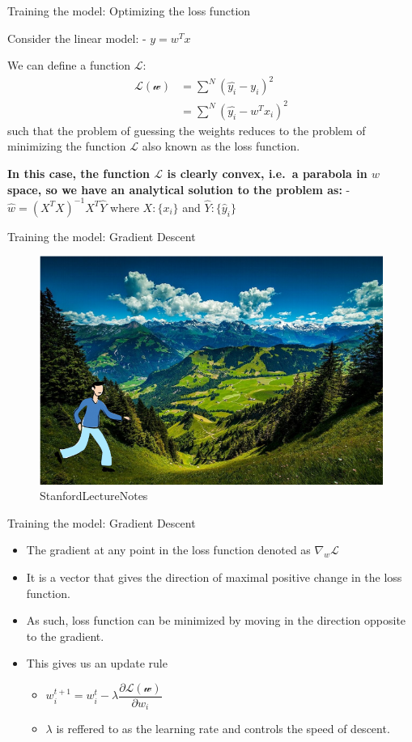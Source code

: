 \documentclass[11pt]{article}
\makeatletter
\def\maxwidth{\ifdim\Gin@nat@width>\linewidth\linewidth
    \else\Gin@nat@width\fi}
\let\Oldincludegraphics\includegraphics
\renewcommand{\includegraphics}[1]{\Oldincludegraphics[width=.8\maxwidth]{#1}}
\providecommand{\tightlist}{%
      \setlength{\itemsep}{0pt}\setlength{\parskip}{0pt}}
\makeatother
\begin{document}
    Training the model: Optimizing the loss function

Consider the linear model: - \(y = w^Tx\)

We can define a function \(\mathcal{L}\): \begin{align}
    \mathcal{L(w)} &= \sum^{N}(\hat{y_i} - y_i)^2\\
    &= \sum^{N}(\hat{y_i} - w^Tx_i)^2
\end{align} such that the problem of guessing the weights reduces to the
problem of minimizing the function \(\mathcal{L}\) also known as the
loss function.

\textbf{In this case, the function \(\mathcal{L}\) is clearly convex,
i.e.~a parabola in \(w\) space, so we have an analytical solution to the
problem as:} - \(\hat{w} = (X^TX)^{-1}X^T\hat{Y}\) where \(X: \{x_i\}\)
and \(\hat{Y}: \{\hat{y}_i\}\)

    Training the model: Gradient Descent

\begin{figure}
\centering
\includegraphics{pres_imgs/mountains.png}
\caption{StanfordLectureNotes}
\end{figure}

    Training the model: Gradient Descent

\begin{itemize}
\item
  The gradient at any point in the loss function denoted as
  \emph{\(\nabla_w\mathcal{L}\)}
\item
  It is a vector that gives the direction of maximal positive change in
  the loss function.
\item
  As such, loss function can be minimized by moving in the direction
  opposite to the gradient.
\item
  This gives us an update rule

  \begin{itemize}
  \tightlist
  \item
    \(w_{i}^{t+1} = w_{i}^{t} - \lambda \dfrac{\partial \mathcal{L(w)}}{\partial{w_i}}\)
  \item
    \(\lambda\) is reffered to as the learning rate and controls the
    speed of descent.
  \end{itemize}
\end{itemize}
\end{document}
